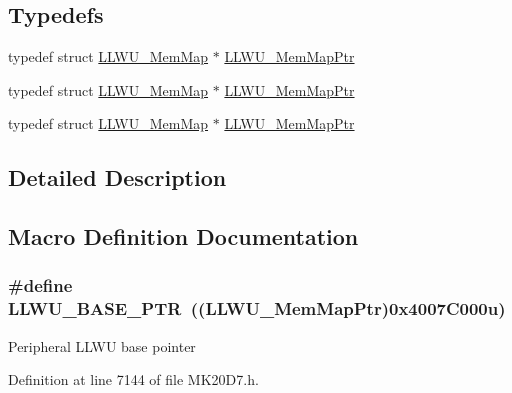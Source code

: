 \subsection*{Typedefs}
\begin{DoxyCompactItemize}
\item 
typedef struct \hyperlink{struct_l_l_w_u___mem_map}{L\+L\+W\+U\+\_\+\+Mem\+Map} $\ast$ \hyperlink{group___l_l_w_u___peripheral_ga03cfefad45ecbfeb2cd16eb85ccfe186}{L\+L\+W\+U\+\_\+\+Mem\+Map\+Ptr}
\item 
typedef struct \hyperlink{struct_l_l_w_u___mem_map}{L\+L\+W\+U\+\_\+\+Mem\+Map} $\ast$ \hyperlink{group___l_l_w_u___peripheral_ga03cfefad45ecbfeb2cd16eb85ccfe186}{L\+L\+W\+U\+\_\+\+Mem\+Map\+Ptr}
\item 
typedef struct \hyperlink{struct_l_l_w_u___mem_map}{L\+L\+W\+U\+\_\+\+Mem\+Map} $\ast$ \hyperlink{group___l_l_w_u___peripheral_ga03cfefad45ecbfeb2cd16eb85ccfe186}{L\+L\+W\+U\+\_\+\+Mem\+Map\+Ptr}
\end{DoxyCompactItemize}


\subsection{Detailed Description}


\subsection{Macro Definition Documentation}
\subsubsection[{\texorpdfstring{L\+L\+W\+U\+\_\+\+B\+A\+S\+E\+\_\+\+P\+TR}{LLWU_BASE_PTR}}]{\setlength{\rightskip}{0pt plus 5cm}\#define L\+L\+W\+U\+\_\+\+B\+A\+S\+E\+\_\+\+P\+TR~(({\bf L\+L\+W\+U\+\_\+\+Mem\+Map\+Ptr})0x4007\+C000u)}\hypertarget{group___l_l_w_u___peripheral_ga89c97b9e8756088cb3d8617c022ae6ac}{}\label{group___l_l_w_u___peripheral_ga89c97b9e8756088cb3d8617c022ae6ac}
Peripheral L\+L\+WU base pointer 

Definition at line 7144 of file M\+K20\+D7.\+h.

